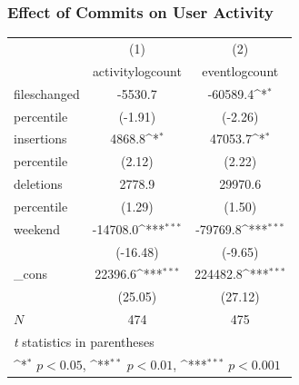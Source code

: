 \documentclass[xcolor=pdftex,dvipsnames,table]{beamer}
\begin{document}
\frame
{
    \frametitle{Effect of Commits on User Activity}
    \begin{table}[h!]
    \footnotesize
    \centering
    {
        \def\sym#1{\ifmmode^{#1}\else\(^{#1}\)\fi}
        \begin{tabular}{l*{2}{c}}
        \hline\hline
            &\multicolumn{1}{c}{(1)}&\multicolumn{1}{c}{(2)}\\
            &\multicolumn{1}{c}{activitylogcount}&\multicolumn{1}{c}{eventlogcount}\\
            \hline
            fileschanged&     -5530.7         &    -60589.4\sym{*}  \\
 percentile           &     (-1.91)         &     (-2.26)   \\
            [1em]
            insertions&      4868.8\sym{*}  &     47053.7\sym{*} \\
percentile
    &      (2.12)         &      (2.22)         \\
        [1em]
        deletions&      2778.9         &     29970.6    \\
        percentile&      (1.29)         &      (1.50)   \\
        [1em]
        weekend     &    -14708.0\sym{***}&    -79769.8\sym{***}\\
        &    (-16.48)         &     (-9.65)      \\
        [1em]
        \_cons      &     22396.6\sym{***}&    224482.8\sym{***}\\
        &     (25.05)         &     (27.12)      \\
        \hline
        \(N\)       &         474         &         475     \\
        \hline\hline
        \multicolumn{3}{l}{\footnotesize \textit{t} statistics in parentheses}\\
        \multicolumn{3}{l}{\footnotesize \sym{*} \(p<0.05\), \sym{**} \(p<0.01\), \sym{***} \(p<0.001\)}\\
        \end{tabular}
    }
    \end{table}
}
\end{document}
